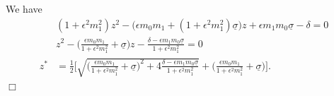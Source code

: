 \documentclass[a4paper,10pt]{article}
\theoremstyle{definition}
\theoremstyle{plain}
\numberwithin{equation}{section}
\newcommand{\hs}{\vspace{3mm}}
\begin{document}
 We have
\begin{align*}
&   (1+\epsilon^2 m_1^2) z^2 
 - \big( \epsilon m_0 m_1 + (1+\epsilon^2 m_1^2)\underline\sigma  \big) z 
 + \epsilon m_1 m_0 \underline\sigma  - \delta = 0 \\
&    z^2 
 - \Big( \frac{\epsilon m_0 m_1}{1+\epsilon^2 m_1^2} + \underline\sigma  \Big) z 
 - \frac{\delta - \epsilon m_1 m_0 \underline\sigma}{1+\epsilon^2 m_1^2} = 0 \\
 z^\ast &= \frac12 \Bigg[ \sqrt{ \Big( \frac{\epsilon m_0 m_1}{1+\epsilon^2 m_1^2} + \underline\sigma  \Big)^2 
 + 4 \frac{\delta - \epsilon m_1 m_0 \underline\sigma}{1+\epsilon^2 m_1^2} }
 + \Big( \frac{\epsilon m_0 m_1}{1+\epsilon^2 m_1^2} + \underline\sigma  \Big)\Bigg].
 \end{align*}\hfill$\Box$
 
 \hs
\end{document}
